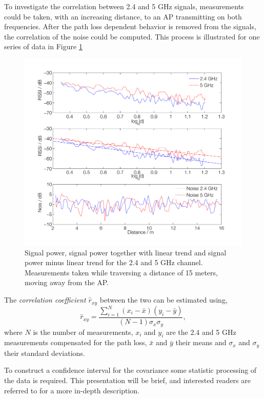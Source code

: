 \documentclass{LTHthesis}
\begin{document}
To investigate the correlation between 2.4 and 5 GHz signals, measurements could be taken, with an increasing distance, to an AP transmitting on both frequencies. After the path loss dependent behavior is removed from the signals, the correlation of the noise could be computed. This process is illustrated for one series of data in Figure \ref{noise_corr_los} 
%
\begin{figure}[!hbt]

\includegraphics[width=1\textwidth ]{images/wifi/noise_corr_los}
\caption{Signal power, signal power together with linear trend and signal power minus linear trend for the 2.4 and 5 GHz channel. Measurements taken while traversing a distance of 15 meters, moving away from the AP.}\label{noise_corr_los}
\end{figure}

The \emph{correlation coefficient $\hat  r_{xy}$} between the two can be estimated using,
\begin{equation}
\hat r_{xy}=\frac{\sum\limits_{i=1}^{N}{(x_i-\bar{x})(y_i-\bar{y})}}{(N-1)\sigma_x\sigma_y},
\end{equation}
where $N$ is the number of measurements, $x_i$ and $y_i$ are the 2.4 and 5 GHz measurements compensated for the path loss, $\bar x$ and $\bar y$ their means and $\sigma_x$ and $\sigma_y$ their standard deviations. 

To construct a confidence interval for the covariance some statistic processing of the data is required. This presentation will be brief, and interested readers are referred to \cite{fisher15, fisher21}  for a more in-depth description. 
\end{document}
